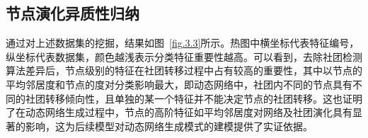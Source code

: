 
\subsection{节点演化异质性归纳}



通过对上述数据集的挖掘，结果如图~\ref{fig.3.3}所示。热图中横坐标代表特征编号，纵坐标代表数据集，颜色越浅表示分类特征重要性越高。可以看到，去除社团检测算法差异后，节点级别的特征在社团转移过程中占有较高的重要性，其中以节点的平均邻居度和节点的度对分类影响最大，即动态网络中，社团内不同的节点具有不同的社团转移倾向性，且单独的某一个特征并不能决定节点的社团转移。这也证明了在动态网络生成过程中，节点的高阶特征如平均邻居度对网络及社团演化具有显著的影响，这为后续模型对动态网络生成模式的建模提供了实证依据。


